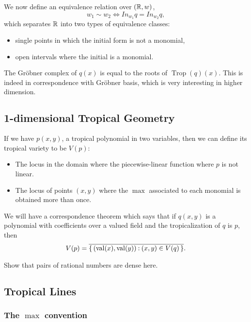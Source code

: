 \documentclass[12pt]{memoir}
\DeclareMathOperator{\val}{val}
\DeclareMathOperator{\Trop}{Trop}
\theoremstyle{definition}
\begin{document}
\par 
We now define an equivalence relation over $(\mathbb{R},w)$,
$$w_1\sim w_2\iff In_{w_1}q=In_{w_2}q,$$ 
which separates $\mathbb{R}$ into two types of equivalence classes:
\begin{itemize}
    \item single points in which the initial form is not a monomial,
    \item open intervals where the initial is a monomial.
\end{itemize}

The Gr\"obner complex of $q(x)$ is equal to the roots of $\Trop(q)(x)$. This is indeed in correspondence with Gr\"obner basis, which is very interesting in higher dimension. 

\subsection{1-dimensional Tropical Geometry}

If we have $p(x,y)$, a tropical polynomial in two variables, then we can define its tropical variety to be $V(p)$:
\begin{itemize}
    \item The locus in the domain where the piecewise-linear function where $p$ is not linear.
    \item The locus of points $(x,y)$ where the $\max$ associated to each monomial is obtained more than once.
\end{itemize}

We will have a correspondence theorem which says that if $q(x,y)$ is a polynomial with coefficients over a valued field and the tropicalization of $q$ is $p$, then 
$$V(p)=\ov{\set{(\val(x),\val(y))\: (x,y)\in V(q)}}.$$
\begin{Ej}
Show that pairs of rational numbers are dense here. 
\end{Ej}

\subsection{Tropical Lines}

\subsubsection{The $\max$ convention}
\end{document}
